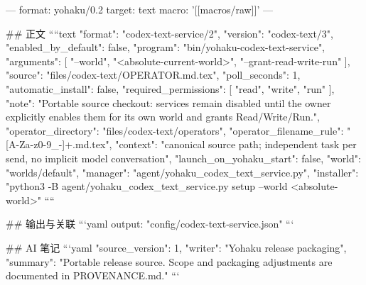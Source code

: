 ---
format: yohaku/0.2
target: text
macro: '[[macros/raw]]'
---

## 正文
````text
{
  "format": "codex-text-service/2",
  "version": "codex-text/3",
  "enabled_by_default": false,
  "program": "bin/yohaku-codex-text-service",
  "arguments": [
    "--world",
    "<absolute-current-world>",
    "--grant-read-write-run"
  ],
  "source": "files/codex-text/OPERATOR.md.tex",
  "poll_seconds": 1,
  "automatic_install": false,
  "required_permissions": [
    "read",
    "write",
    "run"
  ],
  "note": "Portable source checkout: services remain disabled until the owner explicitly enables them for its own world and grants Read/Write/Run.",
  "operator_directory": "files/codex-text/operators",
  "operator_filename_rule": "[A-Za-z0-9_-]+.md.tex",
  "context": "canonical source path; independent task per send, no implicit model conversation",
  "launch_on_yohaku_start": false,
  "world": "worlds/default",
  "manager": "agent/yohaku_codex_text_service.py",
  "installer": "python3 -B agent/yohaku_codex_text_service.py setup --world <absolute-world>"
}
````

## 输出与关联
```yaml
output: "config/codex-text-service.json"
```

## AI 笔记
```yaml
{"source_version": 1, "writer": "Yohaku release packaging", "summary": "Portable release source. Scope and packaging adjustments are documented in PROVENANCE.md."}
```
